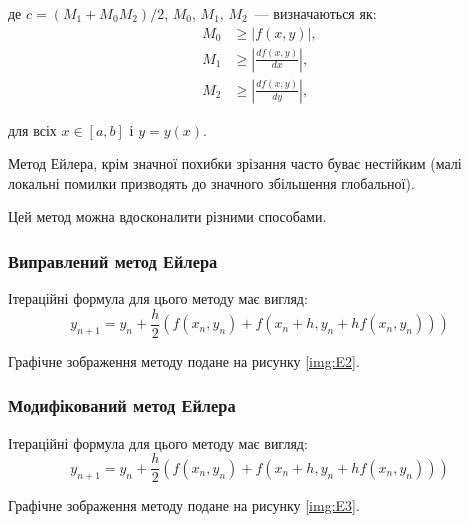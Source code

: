     де $c=(M_1+M_0M_2)/2$, $M_0$, $M_1$, $M_2$~--- визначаються як:
\begin{equation}
  \begin{split}
    M_0 &\ge |f(x,y)|,\\
    M_1 &\ge \left|\frac{df(x,y)}{dx}\right|,\\
    M_2 &\ge \left|\frac{df(x,y)}{dy}\right|,
  \end{split}
\end{equation}
 
для всіх $x \in [a,b]$ і $y=y(x)$.

Метод Ейлера, крім значної похибки зрізання часто буває нестійким 
(малі локальні помилки призводять до значного збільшення глобальної).

Цей метод можна вдосконалити різними способами.

\subsubsection{Виправлений метод Ейлера}\label{sss:E2}

Ітераційні формула для цього методу має вигляд:
\begin{equation}\label{eq:E2}
    y_{n+1}=y_n+\frac{h}{2}(f(x_n,y_n)+f(x_n+h,y_n+hf(x_n,y_n)))
\end{equation}

Графічне зображення методу подане на рисунку \ref{img:E2}.



\subsubsection{Модифікований метод Ейлера}\label{sss:E3}

Ітераційні формула для цього методу має вигляд:
\begin{equation}\label{eq:E3}
    y_{n+1}=y_n+\frac{h}{2}(f(x_n,y_n)+f(x_n+h,y_n+hf(x_n,y_n)))
\end{equation}

Графічне зображення методу подане на рисунку \ref{img:E3}.



